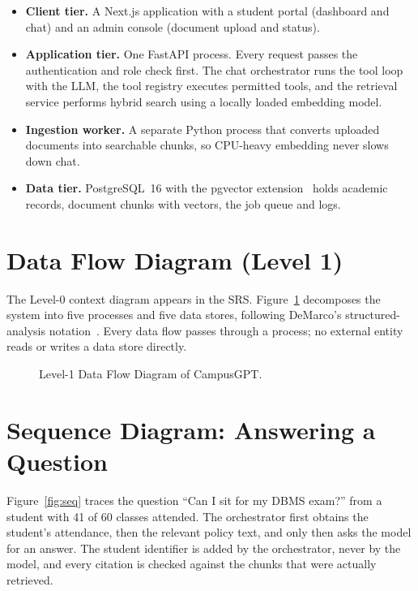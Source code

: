\documentclass[11pt,a4paper,oneside]{report}
\begin{document}
\begin{itemize}[itemsep=1pt]
  \item \textbf{Client tier.} A Next.js application with a student portal (dashboard and
        chat) and an admin console (document upload and status).
  \item \textbf{Application tier.} One FastAPI process. Every request passes the
        authentication and role check first. The chat orchestrator runs the tool loop with
        the LLM, the tool registry executes permitted tools, and the retrieval service
        performs hybrid search using a locally loaded embedding model.
  \item \textbf{Ingestion worker.} A separate Python process that converts uploaded
        documents into searchable chunks, so CPU-heavy embedding never slows down chat.
  \item \textbf{Data tier.} PostgreSQL~16 with the pgvector extension~\cite{pgvector} holds
        academic records, document chunks with vectors, the job queue and logs.
\end{itemize}

\section{Data Flow Diagram (Level 1)}
The Level-0 context diagram appears in the SRS. Figure~\ref{fig:dfd} decomposes the system
into five processes and five data stores, following DeMarco's structured-analysis
notation~\cite{demarco1978}. Every data flow passes through a process; no external entity
reads or writes a data store directly.

\begin{figure}[H]
\centering
\resizebox{\textwidth}{!}{}
\caption{Level-1 Data Flow Diagram of CampusGPT.}
\label{fig:dfd}
\end{figure}

\section{Sequence Diagram: Answering a Question}
Figure~\ref{fig:seq} traces the question ``Can I sit for my DBMS exam?'' from a student
with 41 of 60 classes attended. The orchestrator first obtains the student's attendance,
then the relevant policy text, and only then asks the model for an answer. The student
identifier is added by the orchestrator, never by the model, and every citation is checked
against the chunks that were actually retrieved.
\end{document}
